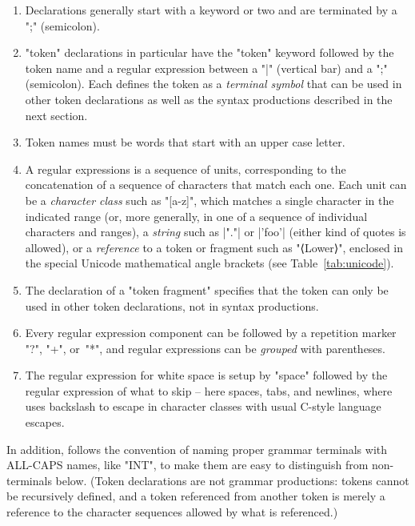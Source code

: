 \documentclass[11pt]{article} %
\begin{document}
\begin{notation}\leavevmode
  \begin{enumerate}

  \item Declarations generally start with a keyword or two and are terminated by a ";" (semicolon).

  \item "token" declarations in particular have the "token" keyword followed by the token name and a
    regular expression between a "|" (vertical bar) and a ";" (semicolon). Each defines the token as
    a \emph{terminal symbol} that can be used in other token declarations as well as the syntax
    productions described in the next section.

  \item Token names must be words that start with an upper case letter.

  \item A regular expressions is a sequence of units, corresponding to the concatenation of a
    sequence of characters that match each one.  Each unit can be a \emph{character class} such as
    "[a-z]", which matches a single character in the indicated range (or, more generally, in one of
    a sequence of individual characters and ranges), a \emph{string} such as \hacsc|"."| or
    \hacsc|'foo'| (either kind of quotes is allowed), or a \emph{reference} to a token or fragment
    such as "⟨Lower⟩", enclosed in the special Unicode mathematical angle brackets (see
    Table~\ref{tab:unicode}).

  \item The declaration of a "token fragment" specifies that the token can only be used in other
    token declarations, not in syntax productions.

  \item Every regular expression component can be followed by a repetition marker "?", "+", or~"*",
    and regular expressions can be \emph{grouped} with parentheses.

  \item The regular expression for white space is setup by "space" followed by the regular
    expression of what to skip -- here spaces, tabs, and newlines, where \HAX uses backslash to
    escape in character classes with usual C-style language escapes.

  \end{enumerate}
  In addition, \HAX follows the convention of naming proper grammar terminals with ALL-CAPS names,
  like "INT", to make them are easy to distinguish from non-terminals below. (Token declarations are
  not grammar productions: tokens cannot be recursively defined, and a token referenced from another
  token is merely a reference to the character sequences allowed by what is referenced.)
\end{notation}
\end{document}
